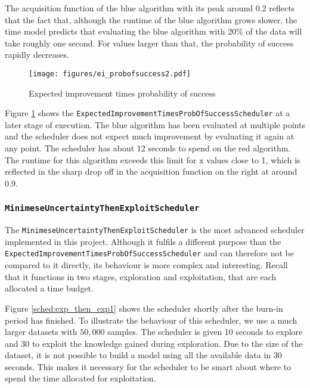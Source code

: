 \documentclass[a4paper,12pt,twoside,openright]{report}
\begin{document}
The acquisition function of the blue algorithm with its peak around 0.2 reflects that the fact that, although the runtime of the blue algorithm grows slower, the time model predicts that evaluating the blue algorithm with 20\% of the data will take roughly one second. For values larger than that, the probability of success rapidly decreases.

\begin{figure}
\centering
  \texttt{[image: figures/ei\_probofsuccess2.pdf]}
  \caption{Expected improvement times probability of success}
  \label{sched:expimprpertime02}
\end{figure}

Figure \ref{sched:expimprpertime02} shows the \texttt{ExpectedImprovementTimesProbOfSuccessScheduler} at a later stage of execution. The blue algorithm has been evaluated at multiple points and the scheduler does not expect much improvement by evaluating it again at any point. The scheduler has about 12 seconds to spend on the red algorithm. The runtime for this algorithm exceeds this limit for x values close to 1, which is reflected in the sharp drop off in the acquisition function on the right at around $0.9$.

\subsubsection{\texttt{MinimeseUncertaintyThenExploitScheduler}}

The \texttt{MinimeseUncertaintyThenExploitScheduler} is the most advanced scheduler implemented in this project. Although it fulfils a different purpose than the \texttt{ExpectedImprovementTimesProbOfSuccessScheduler} and can therefore not be compared to it directly, its behaviour is more complex and interesting. Recall that it functions in two stages, exploration and exploitation, that are each allocated a time budget.

Figure \ref{sched:exp_then_exp1} shows the scheduler shortly after the burn-in period has finished. To illustrate the behaviour of this scheduler, we use a much larger datasets with $50,000$ samples. The scheduler is given 10 seconds to explore and 30 to exploit the knowledge gained during exploration. Due to the size of the dataset, it is not possible to build a model using all the available data in 30 seconds. This makes it necessary for the scheduler to be smart about where to spend the time allocated for exploitation.
\end{document}

